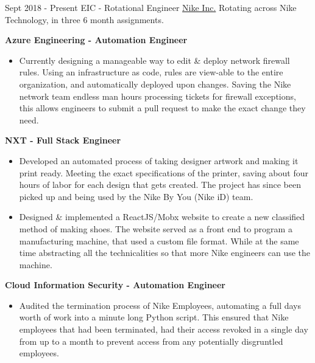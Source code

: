 \documentclass[letterpaper]{twentysecondcv} %
\begin{document}
    \begin{twenty} %
        \twentyitem
        	{Sept 2018 -}
    		{Present}
            {EIC - Rotational Engineer}
            {\href{https://www.nike.com/}{Nike Inc.}}
            { \vspace{1mm} Rotating across Nike Technology, in three 6 month assignments. }
            {
            \newline
            {\bf Azure Engineering - Automation Engineer}  
            \begin{itemize}
                \item Currently designing a manageable way to edit \& deploy network firewall rules. Using an infrastructure as code, rules are view-able to the entire organization, and automatically deployed upon changes.  Saving the Nike network team endless man hours processing tickets for firewall exceptions, this allows engineers to submit a pull request to make the exact change they need. 
            \end{itemize}
            
            \vspace{3mm}
            
            {\bf NXT - Full Stack Engineer} 
            \vspace{2mm}
            \begin{itemize}
                \item Developed an automated process of taking designer artwork and making it print ready. Meeting the exact specifications of the printer, saving about four hours of labor for each design that gets created. The project has since been picked up and being used by the Nike By You (Nike iD) team.
                \vspace{1mm}
                \item Designed \& implemented a ReactJS/Mobx website to create a new classified method of making shoes. The website served as a front end to program a manufacturing machine, that used a custom file format. While at the same time abstracting all the technicalities so that more Nike engineers can use the machine. 
            \end{itemize}
            
            \vspace{3mm}
            {\bf Cloud Information Security - Automation Engineer }
            \vspace{2mm}
            \begin{itemize}
                \item Audited the termination process of Nike Employees, automating a full days worth of work into a minute long Python script. This ensured that Nike employees that had been terminated, had their access revoked in a single day from up to a month to prevent access from any potentially disgruntled employees.
                \vspace{1mm}
                

\end{itemize}}
\end{twenty}
\end{document}
